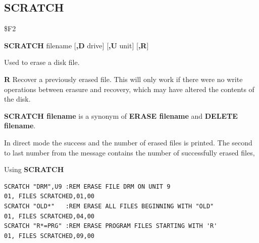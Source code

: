 \subsection{SCRATCH}
\begin{description}[leftmargin=2cm,style=nextline]
\item [Token:] \$F2
\item [Format:] {\bf SCRATCH} filename [{\bf,D} drive] [{\bf,U} unit] [{\bf,R}]
\item [Usage:] Used to erase a disk file.

   \filenamedefinition

   \drivedefinition

   \unitdefinition

   {\bf R} Recover a previously erased file.
   This will only work if there were no write operations
   between erasure and recovery, which may have altered the
   contents of the disk.

\item [Remarks:] {\bf SCRATCH filename} is a synonym of {\bf ERASE filename}
                 and {\bf DELETE filename}.

   In direct mode the success and the number of erased files is printed.
                 The second to last number from the message
                 contains the number of successfully erased files,

\item [Examples:] Using {\bf SCRATCH}
\begin{tcolorbox}[colback=black,coltext=white]
\verbatimfont{\codefont}
\begin{verbatim}
SCRATCH "DRM",U9 :REM ERASE FILE DRM ON UNIT 9
01, FILES SCRATCHED,01,00
SCRATCH "OLD*"   :REM ERASE ALL FILES BEGINNING WITH "OLD"
01, FILES SCRATCHED,04,00
SCRATCH "R*=PRG" :REM ERASE PROGRAM FILES STARTING WITH 'R'
01, FILES SCRATCHED,09,00
\end{verbatim}
\end{tcolorbox}
\end{description}


\newpage

